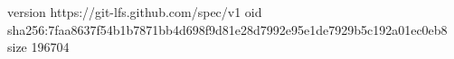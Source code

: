 version https://git-lfs.github.com/spec/v1
oid sha256:7faa8637f54b1b7871bb4d698f9d81e28d7992e95e1de7929b5c192a01ec0eb8
size 196704
